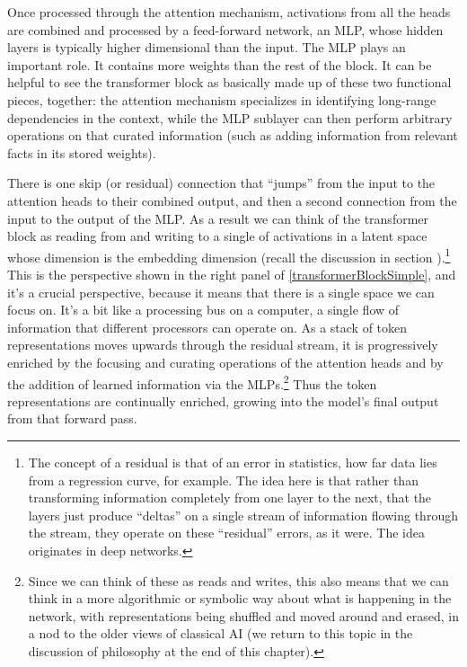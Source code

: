 Once processed through the attention mechanism, activations from all the heads are combined and processed by a
feed-forward network, an MLP, whose hidden layers is typically higher
dimensional than the input. The MLP plays an important role. It contains more
weights than the rest of the block. It can be helpful to see the transformer
block as basically made up of these two functional pieces, together: the
attention mechanism specializes in identifying long-range dependencies in the
context, while the MLP sublayer can then
perform arbitrary operations on that curated information (such as adding information from 
relevant facts in its stored weights).  

There is one skip (or residual) connection that ``jumps'' from the input to the attention heads to their combined output, and then a second connection from the input to the output of the MLP. As a result we can think of the transformer block as reading
from and writing to a single  of activations in a
latent space \cite{elhage2021mathematical, milliere2024philosophical2} whose
dimension is the embedding dimension (recall the discussion in section
).\footnote{The concept of a residual is that of an error
in statistics, how far data lies from a regression curve, for example. The idea
here is that rather than transforming information completely from one layer to
the next, that the layers just produce ``deltas'' on a single stream of
information flowing through the stream, they operate on these ``residual''
errors, as it were. The idea originates in deep networks.} This is the
perspective shown in the right panel of \ref{transformerBlockSimple}, and it's
a crucial perspective, because it means that there is a single space we can
focus on. It's a bit like a processing bus on a computer, a single flow of information that different processors can operate on.  As a stack of token representations moves upwards through the
residual stream, it is progressively enriched by the focusing and curating operations of the attention heads and by the addition of learned information via the MLPs.\footnote{Since we can think of these as reads and writes, this
also means that we can think in a more algorithmic or symbolic way about what
is happening in the network, with representations being shuffled and moved
around and erased, in a nod to the older views of classical AI (we return to
this topic in the discussion of philosophy at the end of this chapter).} Thus
the token representations are continually enriched, growing into the model's
final output from that forward pass. 

